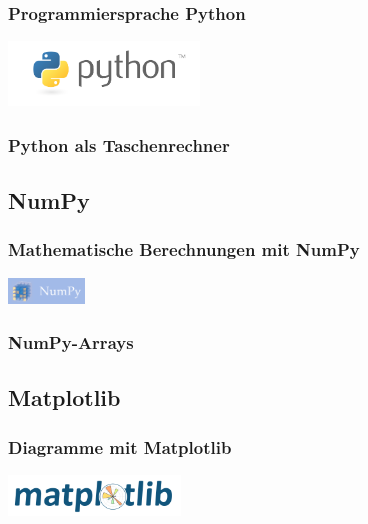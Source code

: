 \documentclass{beamer}
\begin{document}
\begin{frame}
  \frametitle{Programmiersprache Python}
  \includegraphics[width=2in]{python-logo.png}
\end{frame}

\begin{frame}
  \frametitle{Python als Taschenrechner}
\end{frame}


\subsection{NumPy}

\begin{frame}
  \frametitle{Mathematische Berechnungen mit NumPy}
  \includegraphics[width=0.8in]{numpy-logo.png}
\end{frame}

\begin{frame}
  \frametitle{NumPy-Arrays}
\end{frame}


\subsection{Matplotlib}

\begin{frame}
  \frametitle{Diagramme mit Matplotlib}
  \includegraphics[width=1.8in]{matplotlib-logo.png}
\end{frame}
\end{document}
